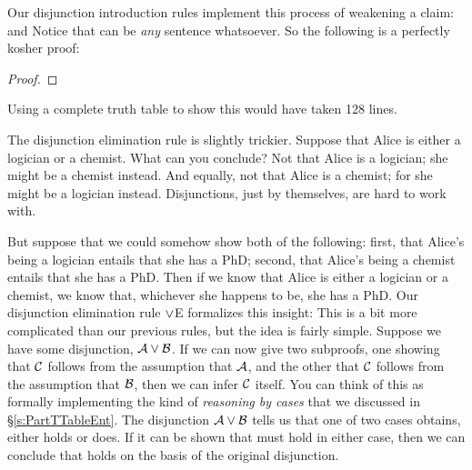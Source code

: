 Our disjunction introduction rules implement this process of weakening a claim:
and
Notice that  can be \emph{any} sentence whatsoever. So the following is a perfectly kosher proof:
\begin{proof}
\end{proof}
Using a complete truth table to show this would have taken 128 lines.

The disjunction elimination rule is slightly trickier. Suppose that Alice is either a logician or a chemist. What can you conclude? Not that Alice is a logician; she might be a chemist instead. And equally, not that Alice is a chemist; for she might be a logician instead. Disjunctions, just by themselves, are hard to work with. 

But suppose that we could somehow show both of the following: first, that Alice's being a logician entails that she has a PhD; second, that Alice's being a chemist entails that she has a PhD. Then if we know that Alice is either a logician or a chemist, we know that, whichever she happens to be, she has a PhD. Our disjunction elimination rule $\vee$E formalizes this insight:
This is a bit more complicated than our previous rules, but the idea is fairly simple. Suppose we have some disjunction, $\mathcal{A} \vee \mathcal{B}$. If we can now give two subproofs, one showing that $\mathcal{C}$ follows from the assumption that $\mathcal{A}$, and the other that $\mathcal{C}$ follows from the assumption that $\mathcal{B}$, then we can infer $\mathcal{C}$ itself. You can think of this as formally implementing the kind of \emph{reasoning by cases} that we discussed in \S\ref{s:PartTTableEnt}.  The disjunction $\mathcal{A} \vee \mathcal{B}$ tells us that one of two cases obtains, either  holds or  does.  If it can be shown that  must hold in either case, then we can conclude that  holds on the basis of the original disjunction.

